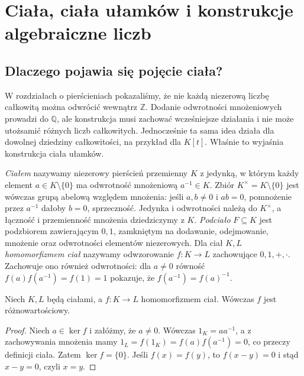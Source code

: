 \chapter[Ciała i ciała ułamków]{Ciała, ciała ułamków i konstrukcje algebraiczne liczb}
\label{aa:ch:fields-fractions}
\setlength{\parskip}{2pt}

\section{Dlaczego pojawia się pojęcie ciała?}
W rozdziałach o pierścieniach pokazaliśmy, że nie każdą niezerową
liczbę całkowitą można odwrócić wewnątrz $\mathbb Z$. Dodanie
odwrotności mnożeniowych prowadzi do $\mathbb Q$, ale konstrukcja
musi zachować wcześniejsze działania i nie może utożsamić
różnych liczb całkowitych. Jednocześnie ta sama idea działa
dla dowolnej dziedziny całkowitości, na przykład dla $K[t]$.
Właśnie to wyjaśnia konstrukcja ciała ułamków.

\begin{definicja}
\label{aa:def:field}
\emph{Ciałem} nazywamy niezerowy pierścień przemienny $K$ z jedynką,
w którym każdy element $a\in K\setminus\{0\}$ ma odwrotność
mnożeniową $a^{-1}\in K$. Zbiór $K^\times=K\setminus\{0\}$
jest wówczas grupą abelową względem mnożenia:
jeśli $a,b\ne0$ i $ab=0$, pomnożenie przez $a^{-1}$
dałoby $b=0$, sprzeczność. Jedynka i odwrotności
należą do $K^\times$, a łączność i przemienność
mnożenia dziedziczymy z $K$.
\emph{Podciało} $F\subseteq K$ jest podzbiorem zawierającym
$0,1$, zamkniętym na dodawanie, odejmowanie, mnożenie
oraz odwrotności elementów niezerowych. Dla ciał $K,L$ \emph{homomorfizmem ciał}
nazywamy odwzorowanie $f:K\to L$ zachowujące
$0,1,+,\cdot$. Zachowuje ono również odwrotności:
dla $a\ne0$ równość $f(a)f(a^{-1})=f(1)=1$
pokazuje, że $f(a^{-1})=f(a)^{-1}$.
\end{definicja}

\begin{stwierdzenie}
\label{aa:st:field-embedding-injective}
Niech $K,L$ będą ciałami, a $f:K\to L$
homomorfizmem ciał. Wówczas $f$ jest różnowartościowy.
\end{stwierdzenie}
\begin{proof}
Niech $a\in\ker f$ i załóżmy, że $a\ne0$. Wówczas
$1_K=aa^{-1}$, a z zachowywania mnożenia mamy
$1_L=f(1_K)=f(a)f(a^{-1})=0$, co przeczy definicji ciała.
Zatem $\ker f=\{0\}$. Jeśli $f(x)=f(y)$, to
$f(x-y)=0$ i stąd $x-y=0$, czyli $x=y$.
\end{proof}

